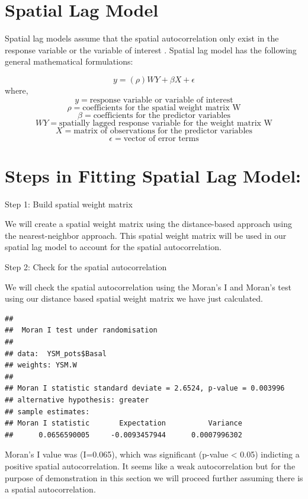 \documentclass[
]{book}
\begin{document}
\hypertarget{spatial-lag-model}{%
\section{Spatial Lag Model}\label{spatial-lag-model}}

Spatial lag models assume that the spatial autocorrelation only exist in the response variable or the variable of interest \citep{anselin_spatial_1998}. Spatial lag model has the following general mathematical formulations:

\[ y=  (\rho)WY + \beta X + \epsilon\]
where, \[y= \text{response variable or variable of interest}\]
\[\rho= \text{coefficients for the spatial weight matrix W}\]
\[\beta= \text{coefficients for the predictor variables}\]
\[WY=\text{spatially lagged response variable for the weight matrix W}\]
\[X=\text{matrix of observations for the predictor variables}\]
\[\epsilon=\text{vector of error terms}\]

\hypertarget{steps-in-fitting-spatial-lag-model}{%
\section{Steps in Fitting Spatial Lag Model:}\label{steps-in-fitting-spatial-lag-model}}

Step 1: Build spatial weight matrix

We will create a spatial weight matrix using the distance-based approach using the nearest-neighbor approach. This spatial weight matrix will be used in our spatial lag model to account for the spatial autocorrelation.

Step 2: Check for the spatial autocorrelation

We will check the spatial autocorrelation using the Moran's I and Moran's test using our distance based spatial weight matrix \citep{getis_constructing_2010} we have just calculated.

\begin{verbatim}
## 
##  Moran I test under randomisation
## 
## data:  YSM_pots$Basal  
## weights: YSM.W    
## 
## Moran I statistic standard deviate = 2.6524, p-value = 0.003996
## alternative hypothesis: greater
## sample estimates:
## Moran I statistic       Expectation          Variance 
##      0.0656590005     -0.0093457944      0.0007996302
\end{verbatim}

Moran's I value was (I=0.065), which was significant (p-value \textless{} 0.05) indicting a positive spatial autocorrelation. It seems like a weak autocorrelation but for the purpose of demonstration in this section we will proceed further assuming there is a spatial autocorrelation.
\end{document}
